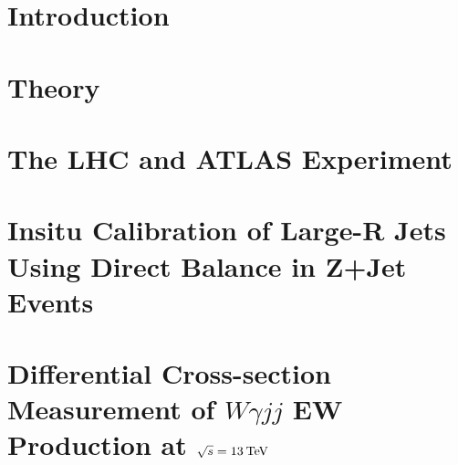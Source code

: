 \justifying
\setlength{\parindent}{0pt}
\newpage
\chapter{Introduction}
\label{sec:intro}

\FloatBarrier

\newpage
\chapter{Theory}
\label{sec:theory}

\FloatBarrier

%

\newpage
\chapter{The LHC and ATLAS Experiment}
\label{sec:atlasdetector}

\FloatBarrier

\newpage
\chapter{Insitu Calibration of Large-R Jets Using Direct Balance in Z+Jet Events}
\label{sec:insitu}

\FloatBarrier

\chapter{Differential Cross-section Measurement of $W\gamma jj$ EW Production at $\sqrt{s}=13\hspace{2pt}\text{Te\kern -0.1em V}$}
\label{sec:vbswy}

\FloatBarrier

